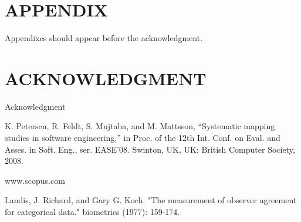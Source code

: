 \documentclass[letterpaper, 10 pt, conference]{ieeeconf}  %
\begin{document}






\section*{APPENDIX}

Appendixes should appear before the acknowledgment.

\section*{ACKNOWLEDGMENT}

Acknowledgment


\begin{thebibliography}{99}

 K. Petersen, R. Feldt, S. Mujtaba, and M. Mattsson, “Systematic mapping studies in software engineering,” in Proc. of the 12th Int. Conf. on Eval. and Asses. in Soft. Eng., ser. EASE’08. Swinton, UK, UK: British Computer Society, 2008.

 www.scopus.com

 Landis, J. Richard, and Gary G. Koch. "The measurement of observer agreement for categorical data." biometrics (1977): 159-174.









\end{thebibliography}
\end{document}
